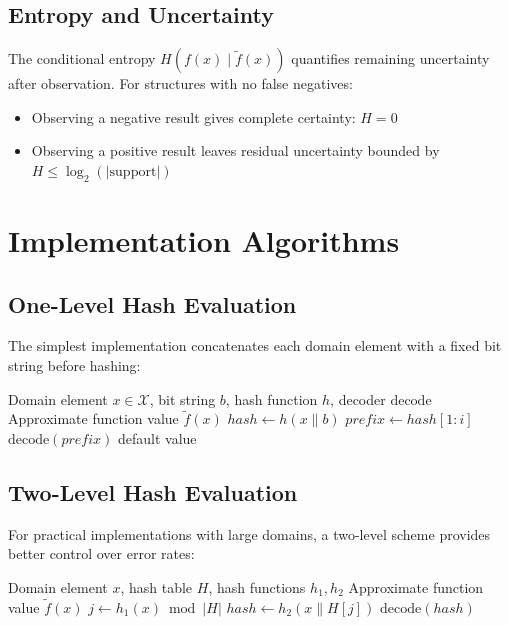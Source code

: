 \documentclass[11pt]{article}
\newcommand{\calX}{\mathcal{X}}
\begin{document}
\subsection{Entropy and Uncertainty}

The conditional entropy $H(f(x) \mid \tilde{f}(x))$ quantifies remaining uncertainty after observation. For structures with no false negatives:
\begin{itemize}
\item Observing a negative result gives complete certainty: $H = 0$
\item Observing a positive result leaves residual uncertainty bounded by $H \leq \log_2(|\text{support}|)$
\end{itemize}

\section{Implementation Algorithms}

\subsection{One-Level Hash Evaluation}

The simplest implementation concatenates each domain element with a fixed bit string before hashing:

\begin{algorithm}
\caption{One-Level Entropy Map Query}
\begin{algorithmic}
\REQUIRE Domain element $x \in \calX$, bit string $b$, hash function $h$, decoder $\text{decode}$
\ENSURE Approximate function value $\tilde{f}(x)$
\STATE $hash \leftarrow h(x \| b)$
    \STATE $prefix \leftarrow hash[1:i]$
        \RETURN $\text{decode}(prefix)$
    \ENDIF
\ENDFOR
\RETURN default value
\end{algorithmic}
\end{algorithm}

\subsection{Two-Level Hash Evaluation}

For practical implementations with large domains, a two-level scheme provides better control over error rates:

\begin{algorithm}
\caption{Two-Level Entropy Map Query}
\begin{algorithmic}
\REQUIRE Domain element $x$, hash table $H$, hash functions $h_1, h_2$
\ENSURE Approximate function value $\tilde{f}(x)$
\STATE $j \leftarrow h_1(x) \bmod |H|$
\STATE $hash \leftarrow h_2(x \| H[j])$
\RETURN $\text{decode}(hash)$
\end{algorithmic}
\end{algorithm}
\end{document}
